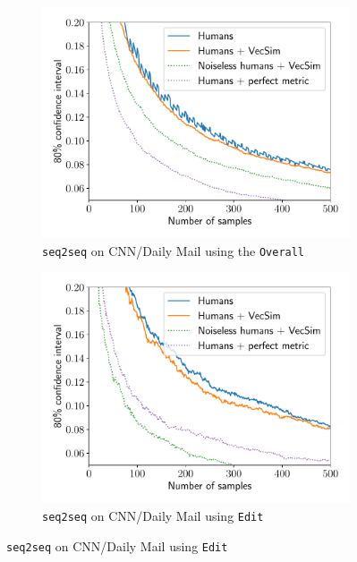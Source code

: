 \begin{figure}[!p]
  \centering
  \begin{subfigure}[t]{0.45\textwidth}
  \includegraphics[width=\textwidth]{figures/lqual_trajectory_foil}
    \caption{\label{fig:trajectory-a}\texttt{seq2seq} on CNN/Daily Mail using the \texttt{Overall}}
  \end{subfigure} 
  \hfill
  \begin{subfigure}[t]{0.45\textwidth}
  \includegraphics[width=\textwidth]{figures/lqual_trajectory}
  \caption{\label{fig:trajectory-b}\texttt{seq2seq} on CNN/Daily Mail using \texttt{Edit} }
  \end{subfigure}


\end{figure}
